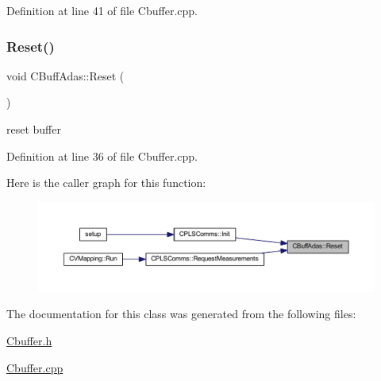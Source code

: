 Definition at line 41 of file Cbuffer.\+cpp.

\mbox{\label{class_c_buff_adas_a2ff1ee5f1dfa56117d76b17027d7b7e8}} 
\subsubsection{\texorpdfstring{Reset()}{Reset()}}
{\footnotesize\ttfamily void C\+Buff\+Adas\+::\+Reset (\begin{DoxyParamCaption}{ }\end{DoxyParamCaption})}



reset buffer 



Definition at line 36 of file Cbuffer.\+cpp.

Here is the caller graph for this function\+:
\nopagebreak
\begin{figure}[H]
\begin{center}
\leavevmode
\includegraphics[width=350pt]{class_c_buff_adas_a2ff1ee5f1dfa56117d76b17027d7b7e8_icgraph}
\end{center}
\end{figure}


The documentation for this class was generated from the following files\+:\begin{DoxyCompactItemize}
\item 
\mbox{\hyperlink{_cbuffer_8h}{Cbuffer.\+h}}\item 
\mbox{\hyperlink{_cbuffer_8cpp}{Cbuffer.\+cpp}}\end{DoxyCompactItemize}
